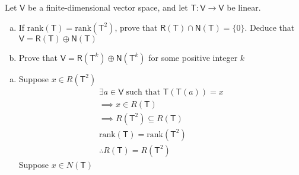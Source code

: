 Let $\mathsf{V}$ be a finite-dimensional vector space, and let
$\mathsf{T}\colon \mathsf{V} \to \mathsf{V}$ be linear.
\begin{enumerate}[(a)]
\item If $\text{rank}(\mathsf{T})=\text{rank}(\mathsf{T}^2)$, prove
  that $\mathsf{R}(\mathsf{T})\cap \mathsf{N}(\mathsf{T}) =
  \{0\}$. Deduce that $\mathsf{V} = \mathsf{R}(\mathsf{T}) \oplus
  \mathsf{N}(\mathsf{T})$
\item Prove that $\mathsf{V} = \mathsf{R}(\mathsf{T}^k) \oplus
  \mathsf{N}(\mathsf{T}^k)$ for some positive integer $k$
\end{enumerate}
\begin{enumerate}[(a)]
\item Suppose $x \in R(\mathsf{T}^2)$
\begin{gather}
\exists a \in \mathsf{V}\;\text{such that } \mathsf{T}(\mathsf{T}(a))
= x\\
\implies x \in R(\mathsf{T})\\
\implies R(\mathsf{T}^2) \subseteq R(\mathsf{T})\\
\text{rank}(\mathsf{T}) = \text{rank}(\mathsf{T}^2)\\
\therefore R(\mathsf{T}) = R(\mathsf{T}^2) \label{one}
\end{gather}
Suppose $x \in N(\mathsf{T})$


\end{enumerate}
